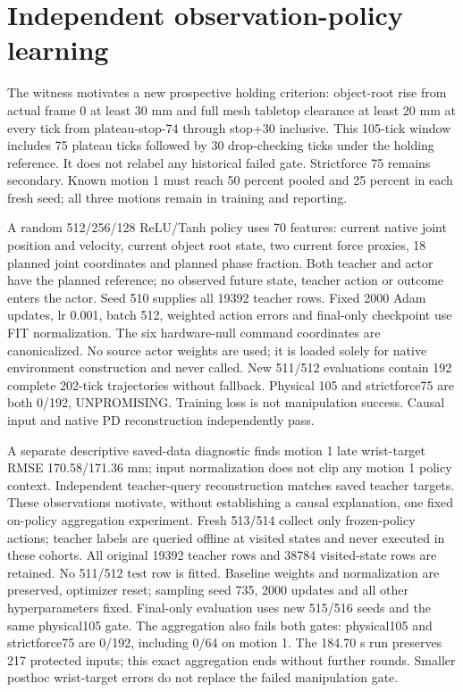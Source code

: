 \documentclass[10 pt]{article}
\begin{document}
\section{Independent observation-policy learning}
The witness motivates a new prospective holding criterion: object-root rise from
actual frame 0 at least 30 mm and full mesh tabletop clearance at least 20 mm at every
tick from plateau-stop-74 through stop+30 inclusive. This 105-tick window includes
75 plateau ticks followed by 30 drop-checking ticks under the holding reference.
It does not relabel any historical failed gate. Strictforce 75 remains secondary.
Known motion 1 must reach 50 percent pooled and 25 percent in each fresh seed;
all three motions remain in training and reporting.

A random 512/256/128 ReLU/Tanh policy uses 70 features: current native joint position
and velocity, current object root state, two current force proxies, 18 planned joint
coordinates and planned phase fraction. Both teacher and actor have the planned
reference; no observed future state, teacher action or outcome enters the actor.
Seed 510 supplies all 19392 teacher rows. Fixed 2000 Adam updates, lr 0.001, batch 512,
weighted action errors and final-only checkpoint use FIT normalization. The six
hardware-null command coordinates are canonicalized. No source actor weights are
used; it is loaded solely for native environment construction and never called.
New 511/512 evaluations contain 192 complete 202-tick trajectories without fallback.
Physical 105 and strictforce75 are both 0/192, UNPROMISING. Training loss is not
manipulation success. Causal input and native PD reconstruction independently pass.

A separate descriptive saved-data diagnostic finds motion 1 late wrist-target
RMSE 170.58/171.36 mm; input normalization does not clip any motion 1 policy context.
Independent teacher-query reconstruction matches saved teacher targets. These
observations motivate, without establishing a causal explanation, one fixed
on-policy aggregation experiment. Fresh 513/514 collect only frozen-policy actions;
teacher labels are queried offline at visited states and never executed in these
cohorts. All original 19392 teacher rows and 38784 visited-state rows are retained.
No 511/512 test row is fitted. Baseline weights and normalization are preserved,
optimizer reset; sampling seed 735, 2000 updates and all other hyperparameters fixed.
Final-only evaluation uses new 515/516 seeds and the same physical105 gate.
The aggregation also fails both gates: physical105 and strictforce75 are 0/192,
including 0/64 on motion 1. The 184.70 s run preserves 217 protected inputs; this exact
aggregation ends without further rounds. Smaller posthoc wrist-target errors
do not replace the failed manipulation gate.
\end{document}
